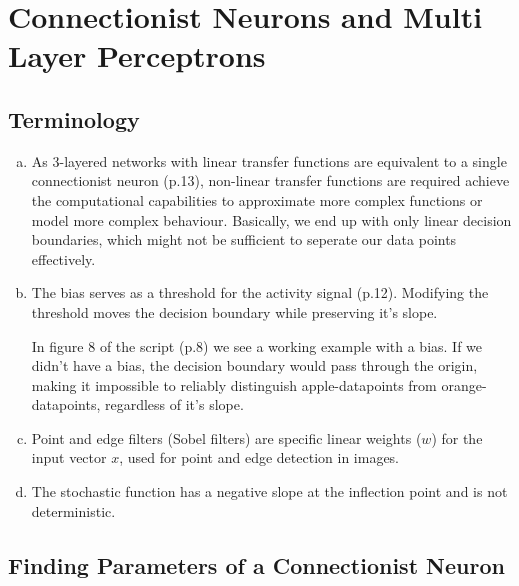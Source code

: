 \documentclass[11pt,a4paper]{article}
\begin{document}
\pagestyle{fancy}

\section{Connectionist Neurons and Multi Layer Perceptrons}

\subsection{Terminology}

\begin{enumerate}[a)]
\item

As 3-layered networks with linear transfer functions are equivalent to a single connectionist neuron (p.13), non-linear transfer functions are required achieve the computational capabilities to approximate more complex functions or model more complex behaviour. Basically, we end up with only linear decision boundaries, which might not be sufficient to seperate our data points effectively.

\item

The bias serves as a threshold for the activity signal (p.12). Modifying the threshold moves the decision boundary while preserving it's slope.

In figure 8 of the script (p.8) we see a working example with a bias. If we didn't have a bias, the decision boundary would pass through the origin, making it impossible to reliably distinguish apple-datapoints from orange-datapoints, regardless of it's slope.

\item

Point and edge filters (Sobel filters) are specific linear weights ($w$) for the input vector $x$, used for point and edge detection in images.

\item

The stochastic function has a negative slope at the inflection point and is not deterministic.

\end{enumerate}
\subsection{Finding Parameters of a Connectionist Neuron}
\end{document}
